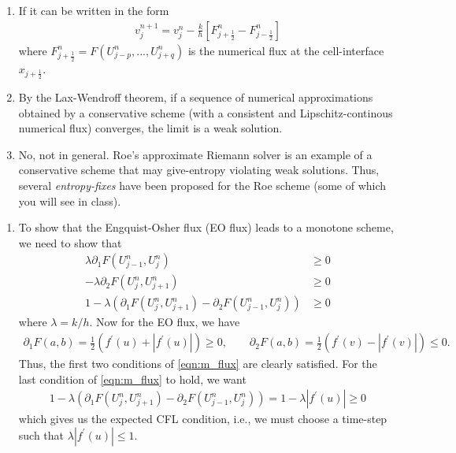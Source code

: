 \documentclass{article}
\newcommand{\jph}{{j+\frac{1}{2}}}
\newcommand{\jmh}{{j-\frac{1}{2}}}
\begin{document}






\begin{exerciseList}


\item
\begin{enumerate}
\item
If it can be written in the form
\begin{gather} \label{consForm}
	v_{j}^{n+1}=v_{j}^{n}-\frac{k}{h}\left[F^n_\jph-F^n_\jmh\right]
\end{gather}
where $F^n_\jph = F(U^n_{j-p},...,U^n_{j+q})$ is the numerical flux at the cell-interface $x_\jph$. 

\item
By the Lax-Wendroff theorem, if a sequence of numerical approximations obtained by a conservative scheme (with a consistent and Lipschitz-continous numerical flux) converges, the limit is a weak solution.

\item
No, not in general. Roe's approximate Riemann solver is an example of a conservative scheme that may give-entropy violating weak solutions. Thus, several \textit{entropy-fixes} have been proposed for the Roe scheme (some of which you will see in class).
\end{enumerate}

\item 
\begin{enumerate}
\item
To show that the Engquist-Osher flux (EO flux) leads to a monotone scheme, we need to show that
\begin{gather} \label{eqn:m_flux}
\lambda \partial_1F(U^n_{j-1},U^n_j) &\geq 0\\
-\lambda \partial_2F(U^n_{j},U^n_{j+1}) &\geq 0\\
1 - \lambda ( \partial_1F(U^n_{j},U^n_{j+1}) - \partial_2F(U^n_{j-1},U^n_j) ) &\geq 0
\end{gather}
where $\lambda = k/h$. Now for the EO flux, we have
\begin{gather}
\partial_1 F(a,b) = \frac{1}{2} \left( f^\prime(u) + |f^\prime(u)| \right) \geq 0, \qquad 
\partial_2 F(a,b) = \frac{1}{2} \left( f^\prime(v) - |f^\prime(v)| \right) \leq 0.
\end{gather}
Thus, the first two conditions of \eqref{eqn:m_flux} are clearly satisfied. For the last condition of \eqref{eqn:m_flux} to hold, we want
\begin{gather}
1 - \lambda ( \partial_1F(U^n_{j},U^n_{j+1}) - \partial_2F(U^n_{j-1},U^n_j) ) = 1 - \lambda |f^\prime(u)| \geq 0 
\end{gather}
which gives us the expected CFL condition, i.e., we must choose a time-step such that $\lambda |f^\prime(u)| \leq 1$.


\end{enumerate}
\end{exerciseList}
\end{document}
